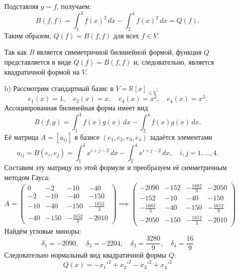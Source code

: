 \documentclass[a4paper]{article}
\renewcommand{\f}[2]{\frac{#1}{#2}}
\begin{document}
\begin{enumerate}
\begin{enumerate}
        Подставляя \(g=f\), получаем:
        \[
        B(f,f)=\int_{1}^{3} f(x)^2\,dx - \int_{2}^{4} f(x)^2\,dx = Q(f).
        \]
        Таким образом, \(Q(f)=B(f,f)\) для всех \(f\in V\).

        Так как \(B\) является симметричной билинейной формой, функция \(Q\) представляется в виде \(Q(f)=B(f,f)\) и, следовательно, является квадратичной формой на \(V\).\\
        
        \item[b)]
        Рассмотрим стандартный базис в \(V=\mathbb{R}[x]_{\le3}\):
        \[
        e_1(x)=1,\quad e_2(x)=x,\quad e_3(x)=x^2,\quad e_4(x)=x^3.
        \]
        Ассоциированная билинейная форма имеет вид
        \[
        B(f,g)=\int_{1}^{3}f(x)g(x)\,dx-\int_{2}^{4}f(x)g(x)\,dx.
        \]
        Её матрица \(A=[a_{ij}]\) в базисе \((e_1,e_2,e_3,e_4)\) задаётся элементами
        \[
        a_{ij}=B(e_i,e_j)=\int_{1}^{3}x^{i+j-2}\,dx-\int_{2}^{4}x^{i+j-2}\,dx,\quad i,j=1,\dots,4.
        \]
        Составим эту матрицу по этой формуле и преобразуем её симметричным методом Гауса:
        $$A = \begin{pmatrix}
            0 & -2 & -10 & -40 \\
            -2 & -10 & -40 & -150 \\
            -10 & -40 & -150 & -\frac{1652}{3} \\
            -40 & -150 & -\frac{1652}{3} & -2010
            \end{pmatrix} \implies \begin{pmatrix}
                -2090 & -152 & -\frac{1682}{3} & -2050 \\
                -152 & -10 & -40 & -150 \\
                -\frac{1682}{3} & -40 & -150 & -\frac{1652}{3} \\
                -2050 & -150 & -\frac{1652}{3} & -2010
            \end{pmatrix}$$
        Найдём угловые миноры:
        $$\delta_1 = -2090, \quad \delta_2 = -2204, \quad \delta_3 = \f{3280}{9}, \quad \delta_4 = \f{16}{9}$$
        Следовательно нормальный вид квадратичной формы $Q$:
        $$Q(x) = -x_1'^2+x_2'^2-x_3'^2+x_4'^2$$

        


\end{enumerate}
\end{enumerate}
\end{document}
